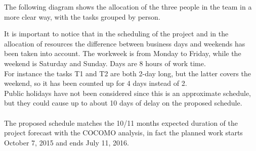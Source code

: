\documentclass[a4paper,11pt]{report} %
\begin{document}
		The following diagram shows the allocation of the three people in the team in a more clear way, with the tasks grouped by person.\\
		\begin{minipage}{\linewidth}
		\end{minipage}
		It is important to notice that in the scheduling of the project and in the allocation of resources the difference between business days and weekends has been taken into account. The workweek is from Monday to Friday, while the weekend is Saturday and Sunday. Days are 8 hours of work time.\\
		For instance the tasks T1 and T2 are both 2-day long, but the latter covers the weekend, so it has been counted up for 4 days instead of 2.\bigskip\\
		Public holidays have not been considered since this is an approximate schedule, but they could cause up to about 10 days of delay on the proposed schedule.\\
		\smallskip\\
		The proposed schedule matches the 10/11 months expected duration of the project forecast with the COCOMO analysis, in fact the planned work starts October 7, 2015 and ends July 11, 2016.
	
	\pagebreak
	\vspace*{-1.3cm}
\end{document}
